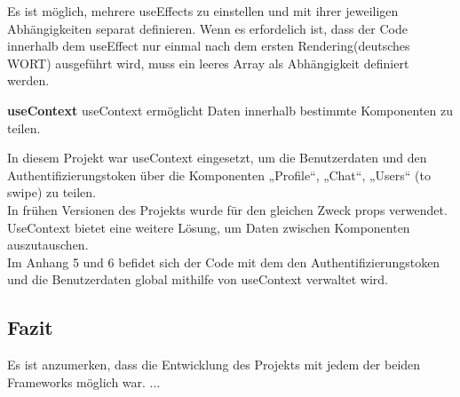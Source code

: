 \begin{flushleft}
  Es ist möglich, mehrere useEffects zu einstellen und mit ihrer jeweiligen Abhängigkeiten separat definieren.
  Wenn es erfordelich ist, dass der Code innerhalb dem useEffect nur einmal nach dem ersten Rendering(deutsches WORT) ausgeführt wird, muss ein leeres Array als Abhängigkeit definiert werden.
\end{flushleft}


\textbf{useContext}
useContext ermöglicht Daten innerhalb bestimmte Komponenten zu teilen.

In diesem Projekt war useContext eingesetzt, um die Benutzerdaten und den Authentifizierungstoken über die Komponenten  „Profile“, „Chat“, „Users“ (to swipe) zu teilen.
\\
In frühen Versionen des Projekts wurde für den gleichen Zweck props verwendet.  {\cite{R03}}
UseContext bietet eine weitere Lösung, um Daten zwischen Komponenten auszutauschen.{\cite{R04}}
\\

Im Anhang 5 und 6 befidet sich der Code mit dem den Authentifizierungstoken und die Benutzerdaten global  mithilfe von useContext verwaltet wird.

\subsection{Fazit}
Es ist anzumerken, dass die Entwicklung des Projekts mit jedem der beiden Frameworks möglich war.
...